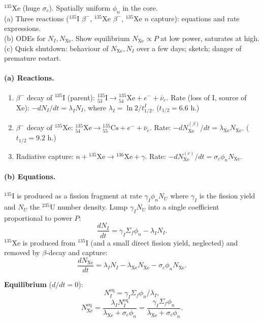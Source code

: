 \documentclass[11pt]{article}
\newcommand{\Q}[1]{\begin{question}#1\end{question}}
\begin{document}
\Q{$^{135}$Xe (huge $\sigma_c$). Spatially uniform $\phi_n$ in the core.\\
(a) Three reactions ($^{135}$I $\beta^-$, $^{135}$Xe $\beta^-$, $^{135}$Xe $n$ capture): equations and rate expressions.\\
(b) ODEs for $N_I,N_\mathrm{Xe}$. Show equilibrium $N_\mathrm{Xe}\propto P$ at low power, saturates at high.\\
(c) Quick shutdown: behaviour of $N_\mathrm{Xe},N_I$ over a few days; sketch; danger of premature restart.}

\paragraph{(a) Reactions.}
\begin{enumerate}[label=(\roman*),itemsep=1pt]
\item $\beta^-$ decay of $^{135}$I (parent): ${}^{135}_{53}\mathrm{I}\to{}^{135}_{54}\mathrm{Xe}+e^-+\bar\nu_e$. Rate (loss of I, source of Xe): $-dN_I/dt=\lambda_I N_I$, where $\lambda_I=\ln 2/t_{1/2}^I$. ($t_{1/2}=6.6$ h.)
\item $\beta^-$ decay of $^{135}$Xe: ${}^{135}_{54}\mathrm{Xe}\to{}^{135}_{55}\mathrm{Cs}+e^-+\bar\nu_e$. Rate: $-dN_\mathrm{Xe}^{(\beta)}/dt=\lambda_\mathrm{Xe} N_\mathrm{Xe}$. ($t_{1/2}=9.2$ h.)
\item Radiative capture: $n+{}^{135}\mathrm{Xe}\to{}^{136}\mathrm{Xe}+\gamma$. Rate: $-dN_\mathrm{Xe}^{(c)}/dt=\sigma_c\phi_n N_\mathrm{Xe}$.
\end{enumerate}

\paragraph{(b) Equations.}
$^{135}$I is produced as a fission fragment at rate $\gamma_I\phi_n N_U$ where $\gamma_I$ is the fission yield and $N_U$ the $^{235}$U number density. Lump $\gamma_I N_U$ into a single coefficient proportional to power $P$:
\[
\frac{dN_I}{dt}=\gamma_I\Sigma_f\phi_n-\lambda_I N_I.
\]
$^{135}$Xe is produced from $^{135}$I (and a small direct fission yield, neglected) and removed by $\beta$-decay and capture:
\[
\frac{dN_\mathrm{Xe}}{dt}=\lambda_I N_I-\lambda_\mathrm{Xe} N_\mathrm{Xe}-\sigma_c\phi_n N_\mathrm{Xe}.
\]

\textbf{Equilibrium} ($d/dt=0$):
\[
N_I^\mathrm{eq}=\gamma_I\Sigma_f\phi_n/\lambda_I,
\]
\[
N_\mathrm{Xe}^\mathrm{eq}=\frac{\lambda_I N_I^\mathrm{eq}}{\lambda_\mathrm{Xe}+\sigma_c\phi_n}=\frac{\gamma_I\Sigma_f\phi_n}{\lambda_\mathrm{Xe}+\sigma_c\phi_n}.
\]
\end{document}
